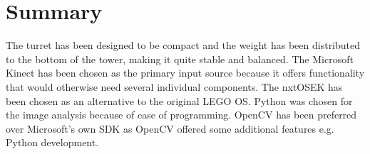 \section{Summary}
The turret has been designed to be compact and the weight has been distributed to the bottom of the tower, making it quite stable and balanced.
The Microsoft Kinect has been chosen as the primary input source because it offers functionality that would otherwise need several individual components.
The nxtOSEK has been chosen as an alternative to the original LEGO OS. Python was chosen for the image analysis because of ease of programming. OpenCV has been preferred over Microsoft's own SDK as OpenCV offered some additional features e.g. Python development.
